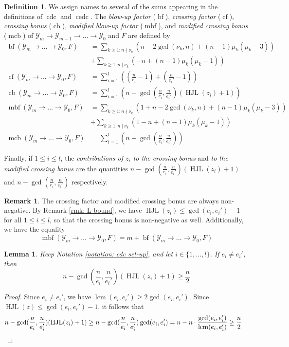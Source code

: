 \documentclass[12pt]{amsart}
\numberwithin{equation}{section}
\newtheorem{lemma}[equation]{Lemma}
\theoremstyle{definition}
\newtheorem{remark}[equation]{Remark}
\newtheorem{defn}[equation]{Definition}
\newcommand{\Y}{\mathcal{Y}}
\DeclareMathOperator{\lcm}{lcm}
\DeclareMathOperator{\blf}{bf}
\DeclareMathOperator{\mbf}{mbf}
\DeclareMathOperator{\cf}{cf}
\DeclareMathOperator{\cb}{cb}
\DeclareMathOperator{\mcb}{mcb}
\DeclareMathOperator{\cdc}{cdc}
\DeclareMathOperator{\cedc}{cedc}
\DeclareMathOperator{\HJL}{HJL}
\begin{document}
\begin{defn}
    We assign names to several of the sums appearing in the definitions of $\cdc$ and $\cedc$. The \textit{blow-up factor} ($\blf$), \textit{crossing factor} ($\cf$), \textit{crossing bonus} ($\cb$), \textit{modified blow-up factor} ($\mbf$), and \textit{modified crossing bonus} ($\mcb$) of $\Y_m\to\Y_{m-1}\to...\to\Y_0$ and $F$ are defined by
    \begin{align*}
        \blf(\Y_m\to...\to\Y_0,F)&=\sum_{k\geq 1:n\nmid\nu_k}(n-2\gcd(\nu_k,n)+(n-1)\mu_k(\mu_k-3))\\
        &+\sum_{k\geq 1:n\mid\nu_k}(-n+(n-1)\mu_k(\mu_k-1))\\
        \cf(\Y_m\to...\to\Y_0,F)&=\sum_{i=1}^l((\frac{n}{e_i}-1)+(\frac{n}{e_i'}-1))\\
        \cb(\Y_m\to...\to\Y_0,F)&=\sum_{i=1}^l(n-\gcd(\frac{n}{e_i},\frac{n}{e_i'})(\HJL(z_i)+1))\\
        \mbf(\Y_m\to...\to\Y_0,F)&=\sum_{k\geq 1:n\nmid\nu_k}(1+n-2\gcd(\nu_k,n)+(n-1)\mu_k(\mu_k-3))\\
        &+\sum_{k\geq 1:n\mid\nu_k}(1-n+(n-1)\mu_k(\mu_k-1))\\
        \mcb(\Y_m\to...\to\Y_0,F)&=\sum_{i=1}^l(n-\gcd(\frac{n}{e_i},\frac{n}{e_i'}))
    \end{align*}  

    Finally, if $1\leq i\leq l$, the \textit{contributions of $z_i$ to the crossing bonus} and \textit{to the modified crossing bonus} are the quantities $n-\gcd(\frac{n}{e_i},\frac{n}{e_i'})(\HJL(z_i)+1)$ and $n-\gcd(\frac{n}{e_i},\frac{n}{e_i'})$ respectively. 
\end{defn}

\begin{remark}\label{rmk: discussion of bf, cf, etc.}
    The crossing factor and modified crossing bonus are always non-negative. By Remark \ref{rmk: L bound}, we have $\HJL(z_i)\leq\gcd(e_i,e_i')-1$ for all $1\leq i\leq l$, so that the crossing bonus is non-negative as well. Additionally, we have the equality
    \[\mbf(\Y_m\to...\to\Y_0,F)=m+\blf(\Y_m\to...\to\Y_0,F)\]
\end{remark}

\begin{lemma}\label{lemma: quick crossing bonus}
    Keep Notation \ref{notation: cdc set-up}, and let $i\in\{1,...,l\}$. If $e_i\neq e_i'$, then \[n-\gcd(\frac{n}{e_i},\frac{n}{e_i'})(\HJL(z_i)+1)\geq \frac{n}{2}\]
\end{lemma}
\begin{proof}
    Since $e_i\neq e_i'$, we have $\lcm(e_i,e_i')\geq 2\gcd(e_i,e_i')$. Since $\HJL(z)\leq\gcd(e_i,e_i')-1$, it follows that
    \begin{align*}
        n-\gcd(\frac{n}{e_i},\frac{n}{e_i'})(\HJL(z_i)+1)&\geq n-\gcd(\frac{n}{e_i},\frac{n}{e_i'})\gcd(e_i,e_i')=n-n\cdot \frac{\gcd(e_i,e_i')}{\lcm(e_i,e_i')}\geq \frac{n}{2}\qedhere
    \end{align*}
\end{proof}
\end{document}
